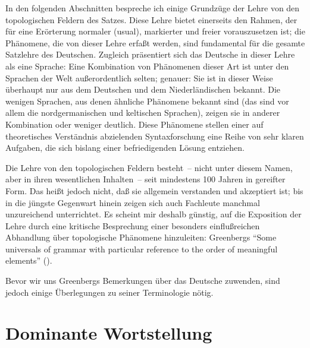 \documentclass[output=paper]{langsci/langscibook}
\begin{document}
In den folgenden Abschnitten bespreche ich einige Grundzüge der Lehre von den
topologischen Feldern des Satzes. Diese Lehre bietet einerseits den Rahmen, der für
eine Erörterung normaler (usual), markierter und freier  vorauszusetzen ist; die Phänomene, die von dieser Lehre erfaßt werden, sind fundamental für
die gesamte Satzlehre des Deutschen. Zugleich präsentiert sich das Deutsche in dieser Lehre als eine  Sprache: Eine Kombination von Phänomenen dieser Art
ist unter den Sprachen der Welt außerordentlich selten; genauer: Sie ist in dieser
Weise überhaupt nur aus dem Deutschen und dem Niederländischen bekannt. Die
wenigen Sprachen, aus denen ähnliche Phänomene bekannt sind (das sind vor allem
die nordgermanischen und keltischen Sprachen), zeigen sie in anderer Kombination
oder weniger deutlich. Diese Phänomene stellen einer auf theoretisches Verständnis
abzielenden Syntaxforschung eine Reihe von sehr klaren Aufgaben, die sich bislang
einer befriedigenden Lösung entziehen.

Die Lehre von den topologischen Feldern besteht~-- nicht unter diesem
Namen, aber in ihren wesentlichen Inhalten~-- seit mindestens 100
Jahren in gereifter Form. Das heißt jedoch nicht, daß sie allgemein
verstanden und akzeptiert ist; bis in die jüngste Gegenwart hinein
zeigen sich auch Fachleute manchmal unzureichend unterrichtet. Es
scheint mir deshalb günstig, auf die Exposition der Lehre durch eine
kritische Besprechung einer besonders einflußreichen Abhandlung über
topologische Phänomene hinzuleiten: Greenbergs "`Some universals of
grammar with particular reference to the order of meaningful elements"'
(\citeyear{Greenberg1963}).

Bevor wir uns Greenbergs Bemerkungen über das Deutsche zuwenden, sind jedoch einige Überlegungen zu seiner Terminologie nötig.
\section{Dominante Wortstellung}%
\label{sec:1-2}
\end{document}
